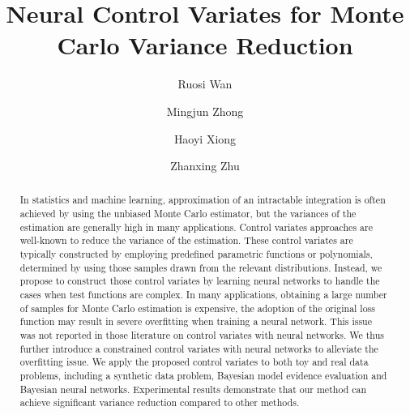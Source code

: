 \documentclass[runningheads]{llncs}
\begin{document}
%
\title{Neural Control Variates for Monte Carlo Variance Reduction}
%
%

\author{Ruosi Wan \and
Mingjun Zhong \and
Haoyi Xiong \and
Zhanxing Zhu\Letter}
%
%


%
\maketitle              %
%
\begin{abstract}
In statistics and machine learning, approximation of an intractable integration is often achieved by using the unbiased Monte Carlo estimator, but the variances of the estimation are generally high in many applications. Control variates approaches are well-known to reduce the variance of the estimation. These control variates are typically constructed by employing predefined parametric functions or polynomials, determined by using those samples drawn from the relevant distributions. Instead, we propose to construct those control variates by learning neural networks to handle the cases when test functions are complex. In many applications, obtaining a large number of samples for Monte Carlo estimation is expensive, the adoption of the original loss function may result in severe overfitting when training a neural network. This issue was not reported in those literature on control variates with neural networks. We thus further introduce a constrained control variates with neural networks to alleviate the overfitting issue. We apply the proposed control variates to both toy and real data problems, including a synthetic data problem, Bayesian model evidence evaluation and  Bayesian neural networks. Experimental results demonstrate that our method can achieve significant variance reduction compared to other methods.

\end{abstract}
%
%
\end{document}
